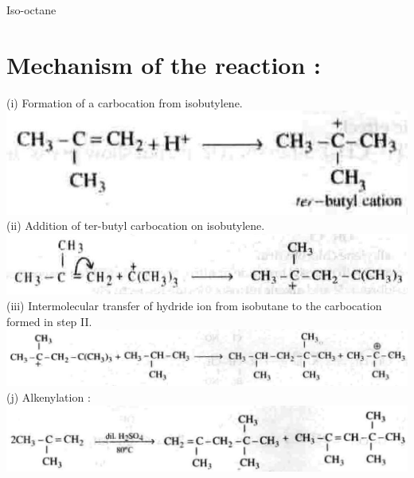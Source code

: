\documentclass[10pt]{article}
\begin{document}
\begin{displayquote}
Iso-octane
\end{displayquote}

\section*{Mechanism of the reaction :}
(i) Formation of a carbocation from isobutylene.\\
\includegraphics[max width=\textwidth, center]{2025_01_28_8470952b98110cec3aabg-182(3)}\\
(ii) Addition of ter-butyl carbocation on isobutylene.\\
\includegraphics[max width=\textwidth, center]{2025_01_28_8470952b98110cec3aabg-182(1)}\\
(iii) Intermolecular transfer of hydride ion from isobutane to the carbocation formed in step II.\\
\includegraphics[max width=\textwidth, center]{2025_01_28_8470952b98110cec3aabg-182(6)}\\
(j) Alkenylation :\\
\includegraphics[max width=\textwidth, center]{2025_01_28_8470952b98110cec3aabg-183(1)}
\end{document}
